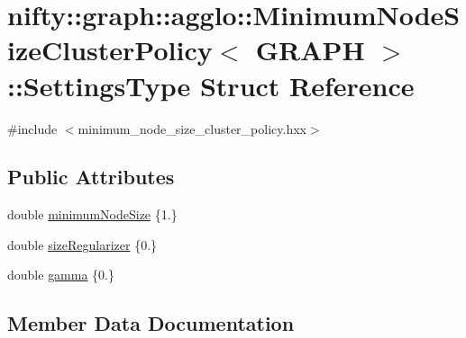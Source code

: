 \hypertarget{structnifty_1_1graph_1_1agglo_1_1MinimumNodeSizeClusterPolicy_1_1SettingsType}{}\section{nifty\+:\+:graph\+:\+:agglo\+:\+:Minimum\+Node\+Size\+Cluster\+Policy$<$ G\+R\+A\+PH $>$\+:\+:Settings\+Type Struct Reference}
\label{structnifty_1_1graph_1_1agglo_1_1MinimumNodeSizeClusterPolicy_1_1SettingsType}


{\ttfamily \#include $<$minimum\+\_\+node\+\_\+size\+\_\+cluster\+\_\+policy.\+hxx$>$}

\subsection*{Public Attributes}
\begin{DoxyCompactItemize}
\item 
double \hyperlink{structnifty_1_1graph_1_1agglo_1_1MinimumNodeSizeClusterPolicy_1_1SettingsType_ab282c9efb91cfaa63a2052694291bbc6}{minimum\+Node\+Size} \{1.\}
\item 
double \hyperlink{structnifty_1_1graph_1_1agglo_1_1MinimumNodeSizeClusterPolicy_1_1SettingsType_a2b5ed9ffa611e37a818f32186cc39d24}{size\+Regularizer} \{0.\}
\item 
double \hyperlink{structnifty_1_1graph_1_1agglo_1_1MinimumNodeSizeClusterPolicy_1_1SettingsType_accfd8d8dc5d46ac1d15e22b529772e0d}{gamma} \{0.\}
\end{DoxyCompactItemize}


\subsection{Member Data Documentation}
\mbox{\label{structnifty_1_1graph_1_1agglo_1_1MinimumNodeSizeClusterPolicy_1_1SettingsType_accfd8d8dc5d46ac1d15e22b529772e0d}} 
